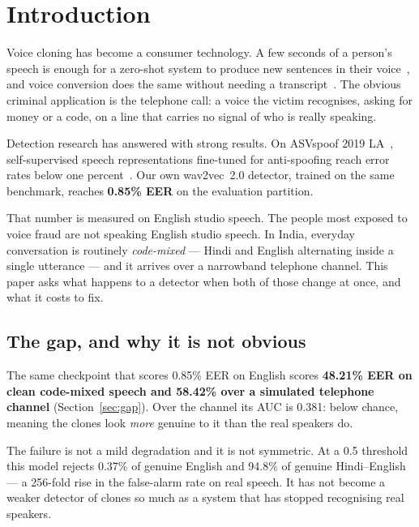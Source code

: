 \section{Introduction}
\label{sec:intro}

Voice cloning has become a consumer technology. A few seconds of a person's speech
is enough for a zero-shot system to produce new sentences in their
voice~\cite{casanova2024xtts,betker2023tortoise}, and voice conversion does the same
without needing a transcript~\cite{rvc2023}. The obvious criminal application is the
telephone call: a voice the victim recognises, asking for money or a code, on a line
that carries no signal of who is really speaking.

Detection research has answered with strong results. On ASVspoof 2019
LA~\cite{todisco2019asvspoof}, self-supervised speech representations fine-tuned for
anti-spoofing reach error rates below one percent~\cite{tak2022wav2vec}. Our own
wav2vec~2.0 detector, trained on the same benchmark, reaches \textbf{0.85\% EER} on the
evaluation partition.

That number is measured on English studio speech. The people most exposed to voice
fraud are not speaking English studio speech. In India, everyday conversation is
routinely \emph{code-mixed} --- Hindi and English alternating inside a single utterance
--- and it arrives over a narrowband telephone channel. This paper asks what happens
to a detector when both of those change at once, and what it costs to fix.

\subsection{The gap, and why it is not obvious}

The same checkpoint that scores 0.85\% EER on English scores \textbf{48.21\% EER on
clean code-mixed speech and 58.42\% over a simulated telephone channel}
(Section~\ref{sec:gap}). Over the channel its AUC is 0.381: below chance, meaning
the clones look \emph{more} genuine to it than the real speakers do.

The failure is not a mild degradation and it is not symmetric. At a 0.5 threshold
this model rejects 0.37\% of genuine English and 94.8\% of genuine Hindi--English ---
a 256-fold rise in the false-alarm rate on real speech. It has not become a weaker
detector of clones so much as a system that has stopped recognising real speakers.

